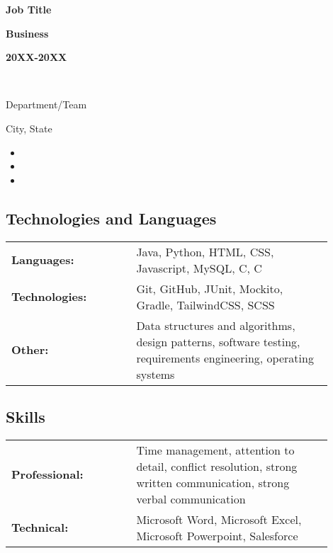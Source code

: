 \documentclass[10pt,a4paper]{article}
\newcommand{\CPP}{
	C\nolinebreak[4]\hspace{-.05em}\raisebox{.22ex}{\footnotesize\bf ++}
}
\newcommand\splitlinehalf[3][t]{%
  \parbox[#1]{\splitcolone\textwidth}{\raggedright#2}%
  \parbox[#1]{\splitcoltwo\textwidth}{\centering#3}%
}
\newcommand\splitlinethirds[4][t]{%
  \parbox[#1]{\splitcolone\textwidth}{\raggedright#2}%
  \parbox[#1]{\splitcoltwo\textwidth}{\centering#3}%
  \parbox[#1]{\splitcolthree\textwidth}{\raggedleft#4}%
}
\def \splitcolone {0.35}
\def \splitcoltwo {0.35}
\def \splitcolthree {0.3}
\def \tablecolone {0.35}
\def \tablecoltwo {0.55}
\begin{document}
\splitlinethirds{\textbf{Job Title}}{\textbf{Business}}{\textbf{20XX-20XX}}\\
\splitlinehalf{Department/Team}{City, State}
\begin{itemize}
	\item \lipsum[3][1-2]
	\item \lipsum[3][2-3]
	\item \lipsum[3][4-6]
\end{itemize}



\subsection*{\textcolor{accent}{\Large Technologies and Languages  \sout{\hfill}}} 

\begin{tabular}{p{\tablecolone\linewidth} p{\tablecoltwo\linewidth}}
	\textbf{Languages:}    & Java, Python, HTML, CSS, Javascript, MySQL, C, \CPP                                                                 \\
	\textbf{Technologies:} & Git, GitHub, JUnit, Mockito, Gradle, TailwindCSS, SCSS                                                         \\
	\textbf{Other:}        & Data structures and algorithms, design patterns, software testing, requirements engineering, operating systems \\
\end{tabular}



\subsection*{\textcolor{accent}{\Large Skills  \sout{\hfill}}} 

\begin{tabular}{p{\tablecolone\linewidth} p{\tablecoltwo\linewidth}}
	\textbf{Professional:} & Time management, attention to detail, conflict resolution, strong written communication, strong verbal communication \\
	\textbf{Technical:}    & Microsoft Word, Microsoft Excel, Microsoft Powerpoint, Salesforce                                                    \\
\end{tabular}
\end{document}
